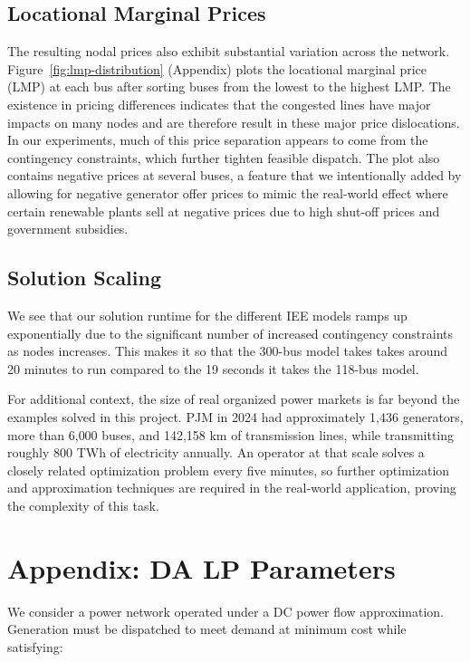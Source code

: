 \documentclass[11pt]{article}
\begin{document}
\subsection{Locational Marginal Prices}

The resulting nodal prices also exhibit substantial variation across the network. Figure~\ref{fig:lmp-distribution} (Appendix) plots the locational marginal price (LMP) at each bus after sorting buses from the lowest to the highest LMP. The existence in pricing differences indicates that the congested lines have major impacts on many nodes and are therefore result in these major price dislocations. In our experiments, much of this price separation appears to come from the contingency constraints, which further tighten feasible dispatch. The plot also contains negative prices at several buses, a feature that we intentionally added by allowing for negative generator offer prices to mimic the real-world effect where certain renewable plants sell at negative prices due to high shut-off prices and government subsidies.

\subsection{Solution Scaling}

We see that our solution runtime for the different IEE models ramps up exponentially due to the significant number of increased contingency constraints as nodes increases. This makes it so that the 300-bus model takes takes around 20 minutes to run compared to the 19 seconds it takes the 118-bus model.

For additional context, the size of real organized power markets is far beyond the examples solved in this project. PJM in 2024 had approximately 1{,}436 generators, more than 6{,}000 buses, and 142{,}158 km of transmission lines, while transmitting roughly 800 TWh of electricity annually. An operator at that scale solves a closely related optimization problem every five minutes, so further optimization and approximation techniques are required in the real-world application, proving the complexity of this task.

\newpage
\appendix

\section{Appendix: DA LP Parameters}

We consider a power network operated under a DC power flow approximation.
Generation must be dispatched to meet demand at minimum cost while satisfying:
\end{document}
